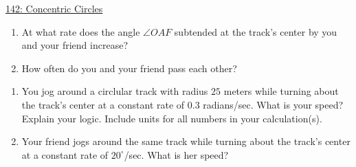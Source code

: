 \documentclass{ximera}
\begin{document}
\begin{question}
\begin{enumerate}
\begin{onlineOnly}
\begin{center}
\end{center}
\end{onlineOnly}

\href{https://www.desmos.com/calculator/s8ua80pw91}{142: Concentric Circles}

\begin{enumerate}
\item At what rate does the angle $\angle OAF$ subtended at the track's center by you and your friend increase?

\item How often do you and your friend pass each other?

\end{enumerate}
\end{enumerate}
\end{question}

\begin{question} \label{Q9df9sttr4rt}
\begin{enumerate}
\item You jog around a circlular track with radius $25$ meters while turning about the track's center at a constant rate of $0.3$ radians/sec. What is your speed? Explain your logic. Include units for all numbers in your calculation(s). 

\item Your friend jogs around the same track while turning about the track's center at a constant rate of $20^\circ$/sec. What is her speed?

\end{enumerate}
\end{question}
\end{document}
